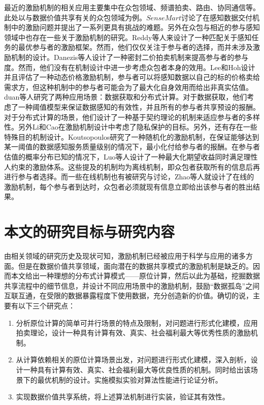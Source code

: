 \documentclass[promaster]{thesis-uestc}
\begin{document}
最近的激励机制的相关应用主要集中在众包领域、频谱拍卖\cite{gao2010map}\cite{wang2011district}\cite{yang2014promise}\cite{zhou2008ebay}、路由\cite{zhong2007designing}、协同通信\cite{chen2010conflicts}\cite{yang2011truthful}等。此处以与数据价值共享有关的众包领域为例。$SenseMart$\cite{chou2007sensing}讨论了在感知数据交付机制中的激励问题并提出了一系列更具有挑战的难题。另外在众包与相近的参与感知领域中也存在一些关于激励机制的研究。Reddy等人来设计了一种匹配关于感知任务的最优参与者的激励框架。然而，他们仅仅关注于参与者的选择，而并未涉及激励机制的设计。Danezis等人设计了一种密封二价拍卖机制来提高参与者的参与度。然而，他们没有在机制设计中进一步考虑众包者本身的效用。Lee和Hoh设计并且评估了一种动态价格激励机制，参与者可以将感知数据以自己的标的价格卖给需求方，但这种机制中的参与者可能会为了最大化自身效用而给出非真实估值。duan等人研究了两种应用场景：数据获取和分布式计算。对于数据获取，他们考虑了一种阈值模型来保证数据感知的有效性，并且所有的参与者共享预设的报酬。对于分布式计算的场景，他们设计了一种基于契约理论的机制来适应参与者的多样性。另外Li和Cao在激励机制设计中考虑了隐私保护的目标。另外，还有存在一些特殊目的机制设计。Koutsopoulos研究了一种随机化的激励机制，在保证能够达到某一阈值的数据感知服务质量级别的情况下，最小化付给参与者的报酬。在参与者估值的概率分布已知的情况下，Luo等人设计了一种最大化期望收益同时满足理性人约束的激励体系。这些提及的机制均为离线机制，即众包者获取所有的信息后再进行参与者选择。而一些在线机制也有被研究与讨论，Zhao等人就设计了在线的激励机制，每个参与者到达时，众包者必须就现有信息立即给出该参与者的胜出结果。



\section{本文的研究目标与研究内容}
由相关领域的研究历史及现状可知，激励机制已经被应用于科学与应用的诸多方面。但是在数据价值共享领域，面向潜在的数据共享模式的激励机制是缺乏的。因而本文给出一种理想的分布式计算模式——原位计算，然后以此为基础，挖掘数据共享流程中的细节信息，并设计不同应用场景中的激励机制，鼓励“数据孤岛”之间互联互通，在受限的数据暴露程度下使用数据，充分创造新的价值。确切的说，主要有以下三个研究点：
\begin{enumerate}
    \item 分析原位计算的简单可并行场景的特点及限制，对问题进行形式化建模，应用拍卖理论，设计一种具有计算有效、真实、社会福利最大等优秀性质的激励机制。
    \item 从计算依赖相关的原位计算场景出发，对问题进行形式化建模，深入剖析，设计一种具有计算有效、真实、社会福利最大等优良性质的机制。同时给出该场景下的最优机制的设计。实施模拟实验对算法性能进行论证分析。
    \item 实现数据价值共享系统，将上述算法机制进行实装，验证其有效性。
\end{enumerate}
\end{document}
